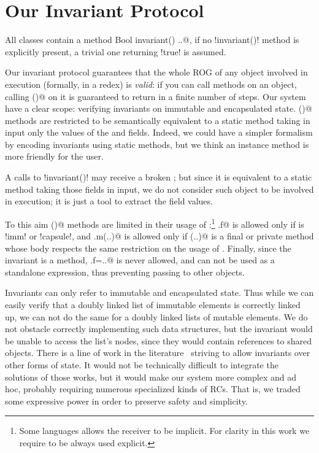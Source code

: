 \section{Our Invariant Protocol}
\label{s:protocol}
All classes contain a \Q@read method Bool invariant() {..}@, if no \Q!invariant()! method is explicitly present, a trivial one returning \Q!true! is assumed.

Our invariant protocol guarantees that the whole ROG of any object involved in execution (formally, in a redex) is \emph{valid}: if you can call methods on an object, calling \Q@invariant()@ on it is guaranteed to return \Q@true@ in a finite number of steps.
Our system have a clear scope:
verifying invariants on immutable and encapsulated state.
\Q@invariant()@ methods are restricted to be semantically equivalent to a static method
taking in input only the values of the \Q@imm@ and \Q@capsule@ fields.
Indeed, we could have a simpler formalism by encoding invariants using static methods, but we think an instance method is more friendly for the user.

A calls to \Q!invariant()! may receive a broken \Q@this@; but since it is equivalent to a static method taking those fields in input, we 
do not consider such \Q@this@ object to be involved in execution; it is just a tool to extract the field values.

To this aim \Q@invariant()@ methods are limited in their usage of \Q@this@:\footnote{Some languages allows the \Q@this@ receiver to be implicit. For clarity in this work we require \Q@this@ to be always used explicit.}
\Q@this.f@ is allowed only if \Q@f@ is \Q!imm! or \Q!capsule!, and 
\Q@this.m(..)@ is allowed only if \Q@m(..)@ is a final or private %
method whose body respects the same restriction on the usage of \Q@this@.
Finally, since the invariant is a \Q@read@ method,
\Q@this.f=..@ is never allowed, and \Q@this@ can not be used as a standalone expression, thus preventing passing \Q@this@ to other objects.

Invariants can only refer to immutable and encapsulated state. Thus while we can easily verify that a doubly linked list of immutable elements
is correctly linked up,
we can not do the same for a doubly linked lists of mutable elements. We do not obstacle correctly implementing such data structures, but the invariant would be unable to access the list's nodes, since they would contain \Q@mut@ references to shared objects.
There is a line of work in the literature~\cite{?} striving to allow invariants over other forms of state.
It would not be technically difficult to 
integrate the solutions of those works, but 
it would make our system more complex and ad hoc, probably requiring numerous specialized kinds of RCs.
That is, we traded some expressive power in order to preserve safety and simplicity.


